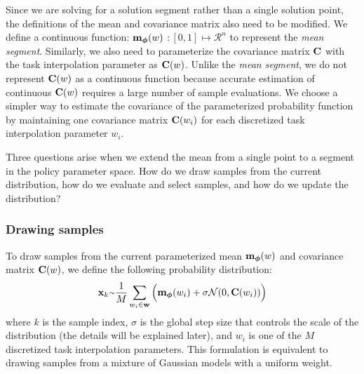 Since we are solving for a solution segment rather than a single
solution point, 
the definitions of the mean and covariance matrix also need to be
modified. We define a continuous function: $\mathbf{m}_{\boldsymbol{\phi}}(w)$
$: [0, 1] \mapsto \mathcal{R}^n$ to represent the \emph{mean
  segment}. Similarly, we also need to parameterize the covariance matrix
$\mathbf{C}$ with the task interpolation parameter as
$\mathbf{C}(w)$.
Unlike the \emph{mean segment}, we do not represent $\mathbf{C}(w)$ as
a continuous function because accurate estimation of
continuous $\mathbf{C}(w)$ requires a large number of sample evaluations. We
choose a simpler way to estimate the covariance of the 
parameterized probability function by maintaining one covariance matrix $\mathbf{C}(w_i)$
for each discretized task interpolation parameter $w_i$.

Three questions arise when we extend the mean from a single point to a
segment in the policy parameter space. How do we draw samples from the
current distribution, how do we evaluate and select samples, and how do we
update the distribution?

\subsubsection{Drawing samples}

To draw samples from the current parameterized mean
$\mathbf{m}_{\boldsymbol{\phi}}(w)$ and covariance matrix $\mathbf{C}(w)$, we
define the following probability distribution:
\begin{equation}
  \begin{aligned}
    \vc{x}_k \mytilde \frac{1}{M} \sum_{w_i \in \vc{w}}
      \Big(
      \vc{m}_{\boldsymbol{\phi}}(w_i) + \sigma \mathcal{N}(
      0, \vc{C}(w_i) ) \Big)
  \end{aligned}
  \label{eq:optskills_drawing_samples}
\end{equation} 
where $k$ is the sample index, $\sigma$ is the global step size that
controls the scale of the distribution (the details will be explained
later), and $w_i$ is one of the $M$ discretized task interpolation
parameters. This formulation is equivalent to drawing samples from a
mixture of Gaussian models with a uniform weight.

